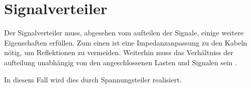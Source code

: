 \section{Signalverteiler}

Der Signalverteiler muss, abgesehen vom aufteilen der Signale, einige weitere Eigenschaften erfüllen. Zum einen ist eine Impedanzanpassung zu den Kabeln nötig, um Reflektionen zu vermeiden. Weiterhin muss das Verhältniss der aufteilung unabhängig von den angeschlossenen Lasten und Signalen sein .

In diesem Fall wird dies durch Spannungsteiler realisiert\cite[298-299]{leotechniques}.
